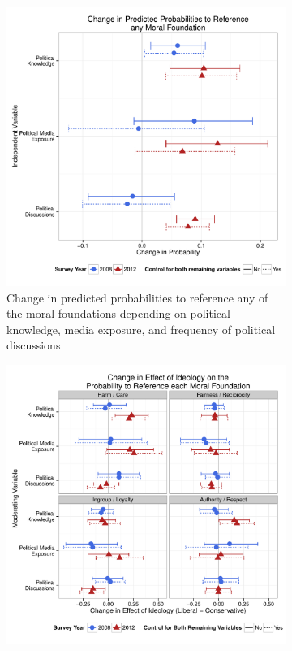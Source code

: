 \documentclass[12pt]{article}
\begin{document}
\begin{figure}[ht]
  \centering
  \caption{INSERT DESCRIPTION}
  \begin{subfigure}[t]{0.49\textwidth}
    \includegraphics[scale=.35]{../calc/fig/appD7learn.pdf}
    \caption{Change in predicted probabilities to reference any of the moral foundations depending on political knowledge, media exposure, and frequency of political discussions}\label{fig:appD7learn}
  \end{subfigure}
  \begin{subfigure}[t]{0.49\textwidth}
    \includegraphics[scale=.35]{../calc/fig/appD8ideolearn.pdf}

\end{subfigure}
\end{figure}
\end{document}
